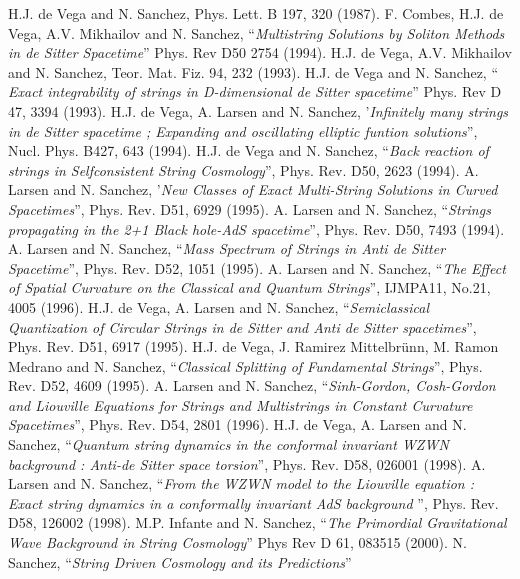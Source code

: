 \documentclass[12pt,a4paper]{article}
\begin{document}
\begin{thebibliography}{23}
 H.J. de Vega and N. Sanchez, Phys. Lett. B 197, 320 (1987). 
 F. Combes, H.J. de Vega, A.V. Mikhailov and N. Sanchez, ``{\it Multistring Solutions by Soliton Methods in de Sitter Spacetime}'' Phys. Rev D50 2754 (1994). 
 H.J. de Vega, A.V. Mikhailov and N. Sanchez, Teor. Mat. Fiz. 94, 232 (1993).
 H.J. de Vega and N. Sanchez, `` {\it Exact integrability of strings in D-dimensional de Sitter spacetime}'' Phys. Rev D 47, 3394 (1993).
 H.J. de Vega, A. Larsen and N. Sanchez, '{\it Infinitely many 
strings in de Sitter spacetime ; Expanding and oscillating elliptic funtion 
solutions}'', Nucl. Phys. B427, 643 (1994).
 H.J. de Vega and N. Sanchez, ``{\it Back reaction of strings in 
Selfconsistent String Cosmology}'', Phys. Rev. D50, 2623 (1994).
 A. Larsen and N. Sanchez, '{\it New Classes of Exact Multi-String Solutions in Curved Spacetimes}'', Phys. Rev. D51, 6929 (1995).
 A. Larsen and N. Sanchez, ``{\it Strings propagating in the 2+1 
Black hole-AdS spacetime}'', Phys. Rev. D50, 7493 (1994).
 A. Larsen and N. Sanchez, ``{\it Mass Spectrum of Strings in 
Anti de Sitter Spacetime}'', Phys. Rev. D52, 1051 (1995).
 A. Larsen and N. Sanchez, ``{\it The Effect of Spatial Curvature on the Classical and Quantum Strings}'', IJMPA11, No.21, 4005 (1996).
 H.J. de Vega, A. Larsen and N. Sanchez, ``{\it Semiclassical 
Quantization of Circular Strings in de Sitter and Anti de Sitter spacetimes}'', Phys. Rev. D51, 6917 (1995).
 H.J. de Vega, J. Ramirez Mittelbr\"unn, M. Ramon Medrano and N. Sanchez, ``{\it Classical Splitting of Fundamental Strings}'', Phys. Rev. D52, 4609 (1995). 
 A. Larsen and N. Sanchez, ``{\it Sinh-Gordon, Cosh-Gordon and 
Liouville Equations for Strings and Multistrings in Constant Curvature 
Spacetimes}'', Phys. Rev. D54, 2801 (1996).
 H.J. de Vega, A. Larsen and N. Sanchez, ``{\it Quantum string 
dynamics in the conformal invariant \coordHE{} WZWN background : Anti-de Sitter 
space torsion}'', Phys. Rev. D58, 026001 (1998).
 A. Larsen and N. Sanchez, ``{\it From the WZWN model to the 
Liouville 
equation : Exact string dynamics in a conformally invariant AdS background} '', 
Phys. Rev. D58, 126002 (1998).
 M.P. Infante and N. Sanchez, ``{\it The Primordial Gravitational Wave Background in String Cosmology}'' Phys Rev D 61, 083515 (2000).
 N. Sanchez, ``{\it String Driven Cosmology and its Predictions}''

\end{thebibliography}
\end{document}
